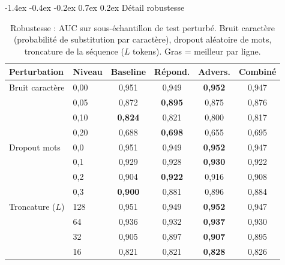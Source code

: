 \documentclass[a4paper,10pt]{article}
\makeatletter
\renewcommand\section{\@startsection{section}{1}{\z@}%
  {-1.4ex \@plus -0.4ex \@minus -0.2ex}%
  {0.7ex \@plus 0.2ex}%
  {\normalfont\large\bfseries}}
\makeatother
\begin{document}
\section{Détail robustesse}
\label{app:robustesse}

\begin{table}[htbp]
  \centering
  \small
  \setlength{\tabcolsep}{5pt}
  \begin{tabular}{llcccc}
    \toprule
    Perturbation & Niveau & Baseline & Répond. & Advers. & Combiné \\
    \midrule
    Bruit caractère & 0,00 & 0,951 & 0,949 & \textbf{0,952} & 0,947 \\
                    & 0,05 & 0,872 & \textbf{0,895} & 0,875 & 0,876 \\
                    & 0,10 & \textbf{0,824} & 0,821 & 0,800 & 0,817 \\
                    & 0,20 & 0,688 & \textbf{0,698} & 0,655 & 0,695 \\
    \midrule
    Dropout mots    & 0,0  & 0,951 & 0,949 & \textbf{0,952} & 0,947 \\
                    & 0,1  & 0,929 & 0,928 & \textbf{0,930} & 0,922 \\
                    & 0,2  & 0,904 & \textbf{0,922} & 0,916 & 0,908 \\
                    & 0,3  & \textbf{0,900} & 0,881 & 0,896 & 0,884 \\
    \midrule
    Troncature ($L$) & 128 & 0,951 & 0,949 & \textbf{0,952} & 0,947 \\
                    & 64  & 0,936 & 0,932 & \textbf{0,937} & 0,930 \\
                    & 32  & 0,905 & 0,897 & \textbf{0,907} & 0,895 \\
                    & 16  & 0,821 & 0,821 & \textbf{0,828} & 0,826 \\
    \bottomrule
  \end{tabular}
  \caption{Robustesse : AUC sur sous-échantillon de test perturbé. Bruit caractère (probabilité de substitution par caractère), dropout aléatoire de mots, troncature de la séquence ($L$ tokens). Gras = meilleur par ligne.}
  \label{tab:robustesse}
\end{table}
\end{document}
